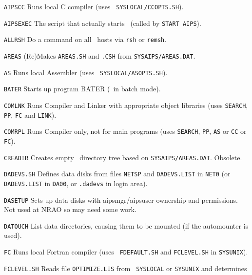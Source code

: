 {\parindent=3.7cm
\item{\tt AIPSCC\quad}   Runs local C compiler (uses {\tt
                         \dol SYSLOCAL/CCOPTS.SH}).
\item{\tt AIPSEXEC\quad} The script that actually starts \AIPS\ (called
                         by {\tt START AIPS}).
\item{\tt ALLRSH\quad}   Do a command on all \AIPS\ hosts via {\tt rsh} or
                         {\tt remsh}.
\item{\tt AREAS\quad}    (Re)Makes {\tt AREAS.SH} and {\tt .CSH} from
                         {\tt\dol SYSAIPS/AREAS.DAT}.
\item{\tt AS\quad}       Runs local Assembler (uses {\tt
                         \dol SYSLOCAL/ASOPTS.SH}).
\item{\tt BATER\quad}    Starts up program BATER (\AIPS\ in batch mode).
\item{\tt COMLNK\quad}   Runs Compiler and Linker with appropriate
                         object libraries (uses {\tt SEARCH}, {\tt
                         PP}, {\tt FC} and {\tt LINK}).
\item{\tt COMRPL\quad}   Runs Compiler only, not for main programs (uses
                         {\tt SEARCH}, {\tt PP}, {\tt AS} or {\tt CC} or
                         {\tt FC}).
\item{\tt CREADIR\quad}  Creates empty \AIPS\ directory tree based on
                         {\tt\dol SYSAIPS/AREAS.DAT}.  Obsolete.
\item{\tt DADEVS.SH\quad} Defines data disks from files {\tt NETSP} and
                         {\tt DADEVS.LIST} in {\tt\dol NET0} (or {\tt
                         DADEVS.LIST} in {\tt\dol DA00}, or {\tt .dadevs}
                         in login area).
\item{\tt DASETUP\quad}  Sets up data disks with aipsmgr/aipsuser
                         ownership and permissions.  Not used at NRAO so
                         may need some work.
\item{\tt DATOUCH\quad}  List data directories, causing them to be
                         mounted (if the automounter is used).
\item{\tt FC\quad}       Runs local Fortran compiler (uses {\tt
                         FDEFAULT.SH} and {\tt FCLEVEL.SH} in
                         {\tt\dol SYSUNIX}).
\item{\tt FCLEVEL.SH\quad} Reads file {\tt OPTIMIZE.LIS} from {\tt
                         \dol SYSLOCAL} or {\tt\dol SYSUNIX} and determines
}
